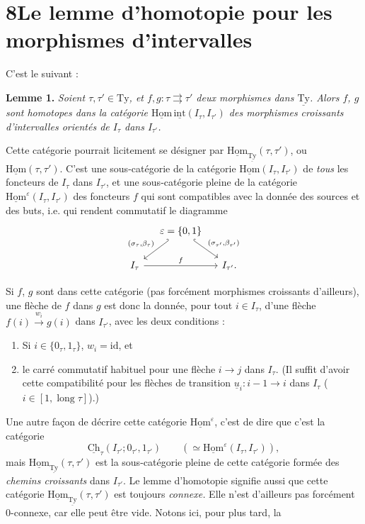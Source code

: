 \documentclass[11pt]{article}
\newcommand{\printedpage}[1]{\marginpar{\footnotesize p.~#1}}
\newcommand{\msp}[1]{\marginpar{\footnotesize [#1]}}
\newcommand{\uHom}{\underline{\mathrm{Hom}}}
\newcommand{\uTy}{\underline{\mathrm{Ty}}}
\newcommand{\ul}[1]{\underline{#1}}
\begin{document}
\printedpage{54}

\msp{page 83}

\section*{8\quad Le lemme d'homotopie pour les morphismes d'intervalles}

C'est le suivant :

\textbf{Lemme 1.} \textit{Soient $\tau,\tau'\in\mathrm{Ty}$, et $f,g:\tau\rightrightarrows\tau'$ deux morphismes dans $\uTy$. Alors $f$, $g$ sont homotopes dans la catégorie $\uHom\,\underline{\mathrm{int}}(I_\tau,I_{\tau'})$ des morphismes croissants d'intervalles orientés de $I_\tau$ dans $I_{\tau'}$.}

Cette catégorie pourrait licitement se désigner par $\uHom_{\uTy}(\tau,\tau')$, ou $\uHom(\tau,\tau')$. C'est une sous-catégorie de la catégorie $\uHom(I_\tau,I_{\tau'})$ de \textit{tous} les foncteurs de $I_\tau$ dans $I_{\tau'}$, et une sous-catégorie pleine de la catégorie $\uHom^\varepsilon(I_\tau,I_{\tau'})$ des foncteurs $f$ qui sont compatibles avec la donnée des sources et des buts, i.e. qui rendent commutatif le diagramme
\[
\begin{tikzcd}[column sep=small]
 & \varepsilon=\{0,1\} \arrow[dl, hook', "{(\sigma_\tau,\beta_\tau)}"'] \arrow[dr, hook, "{(\sigma_{\tau'},\beta_{\tau'})}"] & \\
I_\tau \arrow[rr, "f"] & & I_{\tau'}.
\end{tikzcd}
\]

Si $f$, $g$ sont dans cette catégorie (pas forcément morphismes croissants d'ailleurs), une flèche de $f$ dans $g$ est donc la donnée, pour tout $i\in I_\tau$, d'une flèche $f(i)\xrightarrow{w_i}g(i)$ dans $I_{\tau'}$, avec les deux conditions :

\begin{enumerate}[label={}, leftmargin=*]
\item[a)] Si $i\in\{0_\tau,1_\tau\}$, $w_i=\mathrm{id}$, et
\item[b)] le carré commutatif habituel pour une flèche $i\longrightarrow j$ dans $I_\tau$. (Il suffit d'avoir cette compatibilité pour les flèches de transition $\ul{u}_i:i-1\longrightarrow i$ dans $I_\tau$ ($i\in[1,\operatorname{long}\tau]$).)
\end{enumerate}

Une autre façon de décrire cette catégorie $\uHom^\varepsilon$, c'est de dire que c'est la catégorie
\msp{page 84}
\[
\underline{\mathrm{Ch}}_\tau(I_{\tau'};0_{\tau'},1_{\tau'})\qquad(\simeq\uHom^\varepsilon(I_\tau,I_{\tau'})),
\]
mais $\uHom_{\uTy}(\tau,\tau')$ est la sous-catégorie pleine de cette catégorie formée des \textit{chemins croissants} dans $I_{\tau'}$. Le lemme d'homotopie signifie aussi que cette catégorie $\uHom_{\uTy}(\tau,\tau')$ est toujours \textit{connexe.} Elle n'est d'ailleurs pas forcément 0-connexe, car elle peut être vide. Notons ici, pour plus tard, la
\end{document}

